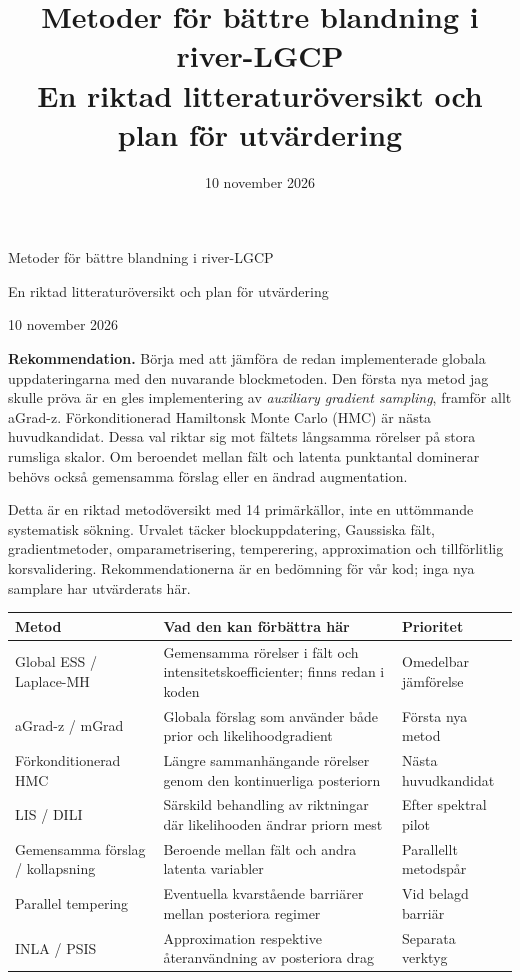 \documentclass[11pt,a4paper]{article}
\title{Metoder för bättre blandning i river-LGCP\\[4pt]\large En riktad litteraturöversikt och plan för utvärdering}
\author{}
\date{10 november 2026}
\begin{document}
\begin{center}
{\LARGE Metoder för bättre blandning i river-LGCP\par}
\vspace{6pt}
{\large En riktad litteraturöversikt och plan för utvärdering\par}
\vspace{8pt}
10 november 2026
\end{center}
\vspace{8pt}

\textbf{Rekommendation.} Börja med att jämföra de redan implementerade globala uppdateringarna med den nuvarande blockmetoden. Den första nya metod jag skulle pröva är en gles implementering av \emph{auxiliary gradient sampling}, framför allt aGrad-z. Förkonditionerad Hamiltonsk Monte Carlo (HMC) är nästa huvudkandidat. Dessa val riktar sig mot fältets långsamma rörelser på stora rumsliga skalor. Om beroendet mellan fält och latenta punktantal dominerar behövs också gemensamma förslag eller en ändrad augmentation.

Detta är en riktad metodöversikt med 14 primärkällor, inte en uttömmande systematisk sökning. Urvalet täcker blockuppdatering, Gaussiska fält, gradientmetoder, omparametrisering, temperering, approximation och tillförlitlig korsvalidering. Rekommendationerna är en bedömning för vår kod; inga nya samplare har utvärderats här.

\begin{center}
\small
\begin{tabularx}{\linewidth}{@{}>{\raggedright\arraybackslash}p{.25\linewidth}>{\raggedright\arraybackslash}X >{\raggedright\arraybackslash}p{.19\linewidth}@{}}
\toprule
Metod & Vad den kan förbättra här & Prioritet \\
\midrule
Global ESS / Laplace-MH & Gemensamma rörelser i fält och intensitetskoefficienter; finns redan i koden & Omedelbar jämförelse \\
aGrad-z / mGrad & Globala förslag som använder både prior och likelihoodgradient & Första nya metod \\
Förkonditionerad HMC & Längre sammanhängande rörelser genom den kontinuerliga posteriorn & Nästa huvudkandidat \\
LIS / DILI & Särskild behandling av riktningar där likelihooden ändrar priorn mest & Efter spektral pilot \\
Gemensamma förslag / kollapsning & Beroende mellan fält och andra latenta variabler & Parallellt metodspår \\
Parallel tempering & Eventuella kvarstående barriärer mellan posteriora regimer & Vid belagd barriär \\
INLA / PSIS & Approximation respektive återanvändning av posteriora drag & Separata verktyg \\
\bottomrule
\end{tabularx}
\end{center}
\clearpage
\end{document}
